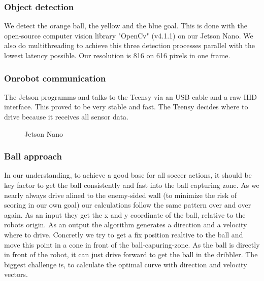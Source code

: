 \documentclass{scrartcl}
\begin{document}
\subsubsection{Object detection}
We detect the orange ball, the yellow and the blue goal. This is done with the open-source computer vision library "OpenCv" (v4.1.1)
on our Jetson Nano. We also do multithreading to achieve this three detection processes parallel with the lowest latency possible.
Our resolution is 816 on 616 pixels in one frame.
\subsubsection{Onrobot communication}
The Jetson programms and talks to the Teensy via an USB cable and a raw HID interface. This proved to be very stable and fast. The Teensy decides where
to drive because it receives all sensor data.

\begin{figure}[!h]
    \begin{center}
    \caption{Jetson Nano}
    \label{jetson}
    \end{center}
    \end{figure}

\newpage

\subsubsection{Ball approach}
In our understanding, to achieve a good base for all soccer actions, it should be key factor to get the ball
consistently and fast into the ball capturing zone.
As we nearly always drive alined to the enemy-sided wall (to minimize the risk of scoring in our own goal) our
calculations follow the same pattern over and over again. As an input they get the x and y coordinate of the
ball, relative to the robots origin. As an output the algorithm generates a direction and a velocity where to drive.
Concretly we try to get a fix position realtive to the ball and move this point in a cone in front of the ball-capuring-zone.
As the ball is directly in front of the robot, it can just drive forward to get the ball in the dribbler. The biggest challenge is,
to calculate the optimal curve with direction and velocity vectors.
\end{document}
